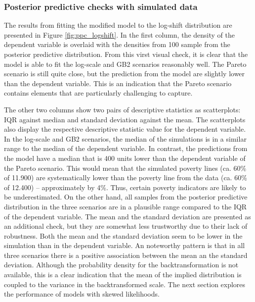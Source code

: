 \subsubsection{Posterior predictive checks with simulated data}
The results from fitting the modified model to the log-shift distribution are presented in Figure \ref{fig:ppc_logshift}.
In the first column, the density of the dependent variable is overlaid with the densities from 100 sample from the posterior predictive distribution.
From this virst visual check, it is clear that the model is able to fit the log-scale and GB2 scenarios reasonably well.
The Pareto scenario is still quite close, but the prediction from the model are slightly lower than the dependent variable.
This is an indication that the Pareto scenario contains elements that are particularly challenging to capture.

The other two columns show two pairs of descriptive statistics as scatterplots: IQR against median and standard deviation against the mean.
The scatterplots also display the respective descriptive statistic value for the dependent variable.
In the log-scale and GB2 scenarios, the median of the simulations is in a similar range to the median of the dependent variable.
In contrast, the predictions from the model have a median that is 400 units lower than the dependent variable of the Pareto scenario.
This would mean that the simulated poverty lines (ca. 60\% of 11.900) are systematically lower than the poverty line from the data (ca. 60\% of 12.400) – approximately by 4\%.
Thus, certain poverty indicators are likely to be underestimated.
On the other hand, all samples from the posterior predictive distribution in the three scenarios are in a plausible range compared to the IQR of the dependent variable.
The mean and the standard deviation are presented as an additional check, but they are somewhat less trustworthy due to their lack of robustness.
Both the mean and the standard deviation seem to be lower in the simulation than in the dependent variable.
An noteworthy pattern is that in all three scenarios there is a positive association between the mean an the standard deviation.
Although the probability density for the backtransformation is not available, this is a clear indication that the mean of the implied distribution is coupled to the variance in the backtransformed scale.
The next section explores the performance of models with skewed likelihoods.

